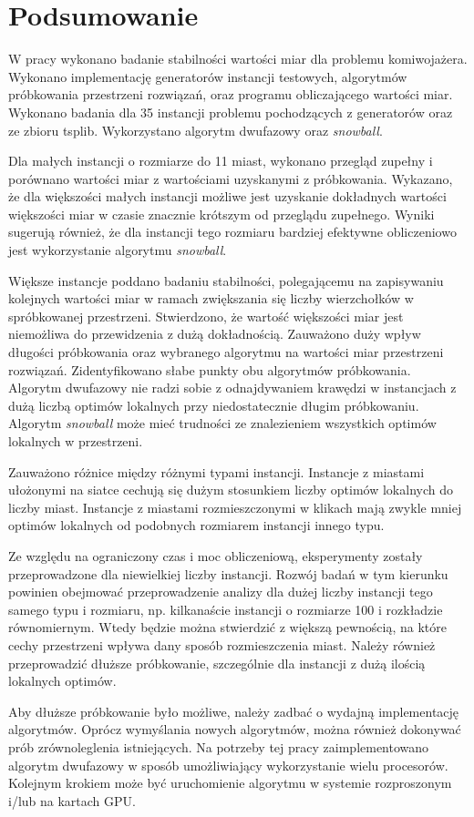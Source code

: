 \chapter{Podsumowanie}

W pracy wykonano badanie stabilności wartości miar dla problemu komiwojażera.
Wykonano implementację generatorów instancji testowych, algorytmów próbkowania przestrzeni rozwiązań,
oraz programu obliczającego wartości miar.
Wykonano badania dla 35 instancji problemu pochodzących z generatorów oraz ze zbioru tsplib.
Wykorzystano algorytm dwufazowy oraz \textit{snowball}.

Dla małych instancji o rozmiarze do 11 miast, wykonano przegląd zupełny i porównano wartości miar z wartościami uzyskanymi
z próbkowania. Wykazano, że dla większości małych instancji możliwe jest uzyskanie dokładnych wartości
większości miar w czasie znacznie krótszym od przeglądu zupełnego.
Wyniki sugerują również, że dla instancji tego rozmiaru bardziej efektywne obliczeniowo jest wykorzystanie
algorytmu \textit{snowball}.

Większe instancje poddano badaniu stabilności, polegającemu na zapisywaniu kolejnych wartości miar
w ramach zwiększania się liczby wierzchołków w spróbkowanej przestrzeni.
Stwierdzono, że wartość większości miar jest niemożliwa do przewidzenia z dużą dokładnością.
Zauważono duży wpływ długości próbkowania oraz wybranego algorytmu na wartości miar przestrzeni rozwiązań.
Zidentyfikowano słabe punkty obu algorytmów próbkowania.
Algorytm dwufazowy nie radzi sobie z odnajdywaniem krawędzi w instancjach z dużą liczbą optimów lokalnych przy niedostatecznie długim próbkowaniu.
Algorytm \textit{snowball} może mieć trudności ze znalezieniem wszystkich optimów lokalnych w przestrzeni.

Zauważono różnice między różnymi typami instancji.
Instancje z miastami ułożonymi na siatce cechują się dużym stosunkiem liczby optimów lokalnych do liczby miast.
Instancje z miastami rozmieszczonymi w klikach mają zwykle mniej optimów lokalnych od podobnych rozmiarem instancji innego typu.

Ze względu na ograniczony czas i moc obliczeniową, eksperymenty zostały przeprowadzone dla niewielkiej liczby instancji.
Rozwój badań w tym kierunku powinien obejmować przeprowadzenie analizy dla dużej liczby instancji tego samego typu i rozmiaru,
np. kilkanaście instancji o rozmiarze 100 i rozkładzie równomiernym.
Wtedy będzie można stwierdzić z większą pewnością, na które cechy przestrzeni wpływa dany sposób rozmieszczenia miast.
Należy również przeprowadzić dłuższe próbkowanie, szczególnie dla instancji z dużą ilością lokalnych optimów.

Aby dłuższe próbkowanie było możliwe, należy zadbać o wydajną implementację algorytmów.
Oprócz wymyślania nowych algorytmów, można również dokonywać prób zrównoleglenia istniejących. 
Na potrzeby tej pracy zaimplementowano algorytm dwufazowy w sposób umożliwiający wykorzystanie wielu procesorów.
Kolejnym krokiem może być uruchomienie algorytmu w systemie rozproszonym i/lub na kartach GPU.